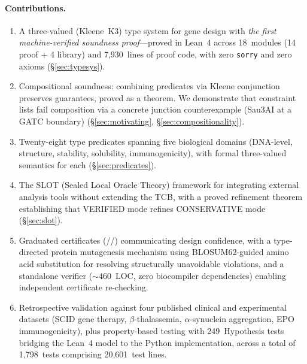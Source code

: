 \paragraph{Contributions.}
\begin{enumerate}[leftmargin=*,itemsep=1pt,topsep=2pt]
\item A three-valued (Kleene~K3) type system for gene design with
      \emph{the first machine-verified soundness proof}---proved in
      Lean~4 across 18~modules (14 proof $+$ 4 library) and
      7,930~lines of proof code, with zero \texttt{sorry} and zero
      axioms (\S\ref{sec:typesys}).

\item Compositional soundness: combining predicates via Kleene
      conjunction preserves guarantees, proved as a theorem.
      We demonstrate that constraint lists fail composition via a
      concrete junction counterexample (Sau3AI at a GATC boundary)
      (\S\ref{sec:motivating}, \S\ref{sec:compositionality}).

\item Twenty-eight type predicates spanning five biological domains
      (DNA-level, structure, stability, solubility, immunogenicity),
      with formal three-valued semantics for each
      (\S\ref{sec:predicates}).

\item The SLOT (Sealed Local Oracle Theory) framework for
      integrating external analysis tools without extending the TCB,
      with a proved refinement theorem establishing that VERIFIED mode
      refines CONSERVATIVE mode (\S\ref{sec:slot}).

\item Graduated certificates (\GOLD/\SILVER/\BRONZE) communicating
      design confidence, with a type-directed protein mutagenesis
      mechanism using BLOSUM62-guided amino acid substitution for
      resolving structurally unavoidable violations, and a standalone
      verifier (${\sim}460$~LOC, zero biocompiler dependencies)
      enabling independent certificate re-checking.

\item Retrospective validation against four published clinical and
      experimental datasets (SCID gene therapy, $\beta$-thalassemia,
      $\alpha$-synuclein aggregation, EPO immunogenicity), plus
      property-based testing with 249~Hypothesis tests bridging the
      Lean~4 model to the Python implementation, across a total of
      1,798~tests comprising 20,601~test lines.
\end{enumerate}

